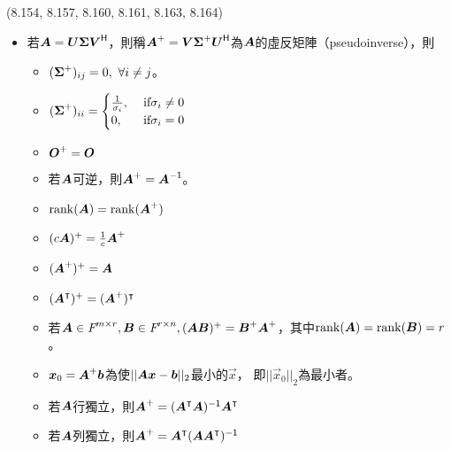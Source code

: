 \begin{theorem}{(8.154, 8.157, 8.160, 8.161, 8.163, 8.164)}
\begin{itemize}
\begin{itemize}
			\end{itemize}
		\item 若$\boldsymbol{A} = \boldsymbol{U\Sigma V}^{\mathsf{H}}$，則稱$\boldsymbol{A}^+ = \boldsymbol{V}\boldsymbol{\Sigma}^+\boldsymbol{U}^{\mathsf{H}}$為$\boldsymbol{A}$的虛反矩陣（pseudoinverse），則
			\begin{itemize}
				\item $(\boldsymbol{\Sigma}^+)_{ij} = 0, \ \forall i \neq j$。
				\item $(\boldsymbol{\Sigma}^+)_{ii} = \begin{cases}
					\frac{1}{\sigma_i}, & \ \text{if} \sigma_i \neq 0 \\
					0, & \ \text{if} \sigma_i = 0
				\end{cases}$
				\item $\boldsymbol{O}^+ = \boldsymbol{O}$
				\item 若$\boldsymbol{A}$可逆，則$\boldsymbol{A}^+ = \boldsymbol{A}^{\mathsf{-1}}$。
				\item $\operatorname{rank}(\boldsymbol{A}) = \operatorname{rank}(\boldsymbol{A}^+)$
				\item $(c\boldsymbol{A})^+ = \frac{1}{c}\boldsymbol{A}^+$
				\item $(\boldsymbol{A}^+)^+ = \boldsymbol{A}$
				\item $(\boldsymbol{A}^\intercal)^+ = (\boldsymbol{A}^+)^\intercal$
				\item 若$\boldsymbol{A} \in \textit{F}^{m \times r}, \boldsymbol{B} \in \textit{F}^{r \times n}, (\boldsymbol{AB})^+ = \boldsymbol{B}^+\boldsymbol{A}^+$，其中$\operatorname{rank}(\boldsymbol{A}) = \operatorname{rank}(\boldsymbol{B}) = r$。
				\item $\boldsymbol{x}_0 = \boldsymbol{A}^+\boldsymbol{b}$為使$||\boldsymbol{A}\boldsymbol{x} - \boldsymbol{b}||_2$最小的$\vec{x}$，
				即$||\vec{x}_0||_2$為最小者。
				\item 若$\boldsymbol{A}$行獨立，則$\boldsymbol{A}^+ = (\boldsymbol{A}^\intercal\boldsymbol{A})^{\mathsf{-1}}\boldsymbol{A}^\intercal$
				\item 若$\boldsymbol{A}$列獨立，則$\boldsymbol{A}^+ = \boldsymbol{A}^\intercal(\boldsymbol{A}\boldsymbol{A}^\intercal)^{\mathsf{-1}}$
			\end{itemize}
	\end{itemize}
\end{theorem}
